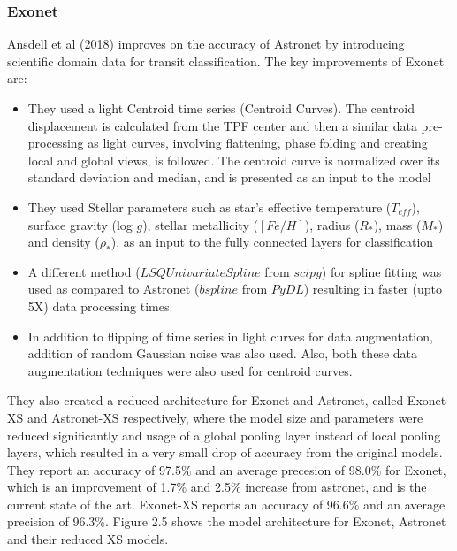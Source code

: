 \subsubsection{Exonet}
Ansdell et al (2018) improves on the accuracy of Astronet by introducing scientific domain data for transit classification. The key improvements of Exonet are:
\begin{itemize}
    \item They used a light Centroid time series (Centroid Curves). The centroid displacement is calculated from the TPF center and then a similar data pre-processing as light curves, involving flattening, phase folding and creating local and global views, is followed. The centroid curve is normalized over its standard deviation and median, and  is presented as an input to the model
    \item They used Stellar parameters such as star's effective temperature ($T_{eff}$), surface gravity (log $g$), stellar metallicity ($[Fe/H]$), radius ($R_{*}$), mass ($M_*$) and density ($\rho_*$), as an input to the fully connected layers for classification
    \item A different method ($LSQUnivariateSpline$ from $scipy$) for spline fitting was used as compared to Astronet ($bspline$ from $PyDL$) resulting in faster (upto 5X) data processing times.
    \item In addition to flipping of time series in light curves for data augmentation, addition of random Gaussian noise was also used. Also, both these data augmentation techniques were also used for centroid curves.
\end{itemize}
They also created a reduced architecture for Exonet and Astronet, called Exonet-XS and Astronet-XS respectively, where the model size and parameters were reduced significantly and usage of a global pooling layer instead of local pooling layers, which resulted in a very small drop of accuracy from the original models. They report an accuracy of 97.5\% and an average precesion of 98.0\% for Exonet, which is an improvement of 1.7\% and 2.5\% increase from astronet, and is the current state of the art. Exonet-XS reports an accuracy of 96.6\% and an average precision of 96.3\%. Figure 2.5 shows the model architecture for Exonet, Astronet and their reduced XS models.
